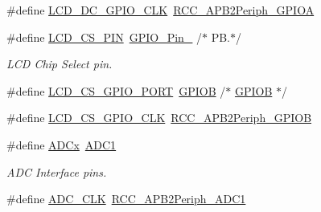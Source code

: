 \begin{DoxyCompactItemize}
\item 
\#define \mbox{\hyperlink{group___s_t_m32_f1_x_x___n_u_c_l_e_o___l_o_w___l_e_v_e_l___exported___constants_gaa5f356963086dc866ef18f8a62541992}{L\+C\+D\+\_\+\+D\+C\+\_\+\+G\+P\+I\+O\+\_\+\+C\+LK}}~\mbox{\hyperlink{group___a_p_b2__peripheral_ga44b92fbf2e288796b1acbce2708f3636}{R\+C\+C\+\_\+\+A\+P\+B2\+Periph\+\_\+\+G\+P\+I\+OA}}
\item 
\#define \mbox{\hyperlink{group___s_t_m32_f1_x_x___n_u_c_l_e_o___l_o_w___l_e_v_e_l___exported___constants_ga50d72083b1ed4dd0bc2eaabb4a0332c8}{L\+C\+D\+\_\+\+C\+S\+\_\+\+P\+IN}}~\mbox{\hyperlink{group___g_p_i_o__pins__define_gaf047899d873f27c2db9f50b342e35a58}{G\+P\+I\+O\+\_\+\+Pin\+\_}}                  /$\ast$ P\+B.$\ast$/
\begin{DoxyCompactList}\small\item\em L\+CD Chip Select pin. \end{DoxyCompactList}\item 
\#define \mbox{\hyperlink{group___s_t_m32_f1_x_x___n_u_c_l_e_o___l_o_w___l_e_v_e_l___exported___constants_gacd6d9762c06baa185975179e4f6135d6}{L\+C\+D\+\_\+\+C\+S\+\_\+\+G\+P\+I\+O\+\_\+\+P\+O\+RT}}~\mbox{\hyperlink{group___peripheral__declaration_ga68b66ac73be4c836db878a42e1fea3cd}{G\+P\+I\+OB}}                       /$\ast$ \mbox{\hyperlink{group___peripheral__declaration_ga68b66ac73be4c836db878a42e1fea3cd}{G\+P\+I\+OB}} $\ast$/
\item 
\#define \mbox{\hyperlink{group___s_t_m32_f1_x_x___n_u_c_l_e_o___l_o_w___l_e_v_e_l___exported___constants_ga9afa8ea431328978f868d24a9df4fb5a}{L\+C\+D\+\_\+\+C\+S\+\_\+\+G\+P\+I\+O\+\_\+\+C\+LK}}~\mbox{\hyperlink{group___a_p_b2__peripheral_ga8c8909c3640508e9ce31dff80010a6dd}{R\+C\+C\+\_\+\+A\+P\+B2\+Periph\+\_\+\+G\+P\+I\+OB}}
\item 
\#define \mbox{\hyperlink{group___s_t_m32_f1_x_x___n_u_c_l_e_o___l_o_w___l_e_v_e_l___exported___constants_gab44c1065d38c298955fc028346984340}{A\+D\+Cx}}~\mbox{\hyperlink{group___peripheral__declaration_ga90d2d5c526ce5c0a551f533eccbee71a}{A\+D\+C1}}
\begin{DoxyCompactList}\small\item\em A\+DC Interface pins. \end{DoxyCompactList}\item 
\#define \mbox{\hyperlink{group___s_t_m32_f1_x_x___n_u_c_l_e_o___l_o_w___l_e_v_e_l___exported___constants_ga44d38ab4d4e88e679184bbbffdac00dd}{A\+D\+C\+\_\+\+C\+LK}}~\mbox{\hyperlink{group___a_p_b2__peripheral_gacd24acb2cd5ca208652157f6c13d3145}{R\+C\+C\+\_\+\+A\+P\+B2\+Periph\+\_\+\+A\+D\+C1}}

\end{DoxyCompactItemize}
